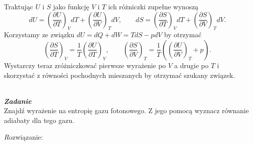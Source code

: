 \documentclass[11pt,a4paper]{article}
\newcounter{zadanie}\newcommand{\zadanie}[1][]{\addtocounter{zadanie}{1} ~\\  {\bf \emph{Zadanie \arabic{zadanie} #1 }} \\}
\begin{document}
Traktując $U$ i $S$ jako funkcję $V$ i $T$ ich różniczki zupełne wynoszą
\begin{equation}
	dU = \left( \frac{\partial U}{\partial T}\right)_V dT + \left( \frac{\partial U}{\partial V}\right)_T dV, \qquad 
	dS = \left( \frac{\partial S}{\partial T}\right)_V dT + \left( \frac{\partial S}{\partial V}\right)_T dV.
\end{equation}
Korzystamy ze związku $dU = dQ + dW = TdS - p dV$ by otrzymać
\begin{equation}
	\left( \frac{\partial S}{\partial T}\right)_V = \frac{1}{T} \left( \frac{\partial U}{\partial T}\right)_V, \qquad 
	\left( \frac{\partial S}{\partial V}\right)_T = \frac{1}{T} \left( \left( \frac{\partial U}{\partial V}\right)_T + p\right).
\end{equation}
Wystarczy teraz zróżniczkować pierwsze wyrażenie po $V$ a drugie po $T$ i skorzystać z równości pochodnych mieszanych by otrzymać szukany związek.

\newpage

\zadanie
Znajdź wyrażenie na entropię gazu fotonowego. 
Z jego pomocą wyznacz równanie adiabaty dla tego gazu.


\vspace{5mm}
{\emph Rozwiązanie:}
\end{document}
